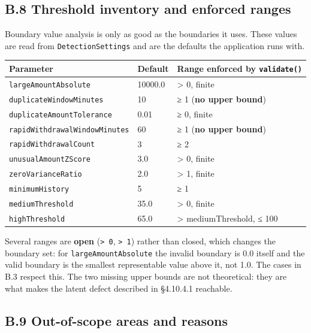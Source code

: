 \documentclass[
  12pt,
]{report}
\begin{document}
\subsection{B.8 Threshold inventory and enforced
ranges}\label{b.8-threshold-inventory-and-enforced-ranges}

Boundary value analysis is only as good as the boundaries it uses. These
values are read from \texttt{Detection\-Settings} and are the defaults the
application runs with.

\begin{longtable}[]{@{}lll@{}}
\toprule\noalign{}
Parameter & Default & Range enforced by \texttt{validate()} \\
\midrule\noalign{}
\endhead
\bottomrule\noalign{}
\endlastfoot
\texttt{large\-Amount\-Absolute} & 10000.0 & \textgreater{} 0, finite \\
\texttt{duplicate\-Window\-Minutes} & 10 & ≥ 1 (\textbf{no upper bound}) \\
\texttt{duplicate\-Amount\-Tolerance} & 0.01 & ≥ 0, finite \\
\texttt{rapid\-Withdrawal\-Window\-Minutes} & 60 & ≥ 1 (\textbf{no upper
bound}) \\
\texttt{rapid\-Withdrawal\-Count} & 3 & ≥ 2 \\
\texttt{unusual\-Amount\-ZScore} & 3.0 & \textgreater{} 0, finite \\
\texttt{zero\-Variance\-Ratio} & 2.0 & \textgreater{} 1, finite \\
\texttt{minimumHistory} & 5 & ≥ 1 \\
\texttt{mediumThreshold} & 35.0 & \textgreater{} 0, finite \\
\texttt{highThreshold} & 65.0 & \textgreater{} mediumThreshold, ≤ 100 \\
\end{longtable}

Several ranges are \textbf{open} (\texttt{\textgreater{}\ 0},
\texttt{\textgreater{}\ 1}) rather than closed, which changes the
boundary set: for \texttt{large\-Amount\-Absolute} the invalid boundary is
0.0 itself and the valid boundary is the smallest representable value
above it, not 1.0. The cases in B.3 respect this. The two missing upper
bounds are not theoretical: they are what makes the latent defect
described in §4.10.4.1 reachable.

\subsection{B.9 Out-of-scope areas and
reasons}\label{b.9-out-of-scope-areas-and-reasons}
\end{document}
